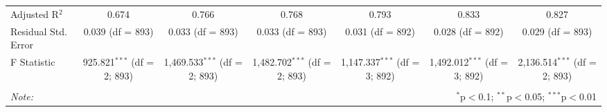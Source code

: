 \begin{table}[!htbp]
\begin{tabular}{@{\extracolsep{5pt}}lcccccc}
Adjusted R$^{2}$ & 0.674 & 0.766 & 0.768 & 0.793 & 0.833 & 0.827 \\
Residual Std. Error & 0.039 (df = 893) & 0.033 (df = 893) & 0.033 (df = 893) & 0.031 (df = 892) & 0.028 (df = 892) & 0.029 (df = 893) \\
F Statistic & 925.821$^{***}$ (df = 2; 893) & 1,469.533$^{***}$ (df = 2; 893) & 1,482.702$^{***}$ (df = 2; 893) & 1,147.337$^{***}$ (df = 3; 892) & 1,492.012$^{***}$ (df = 3; 892) & 2,136.514$^{***}$ (df = 2; 893) \\
\hline
\hline \\[-1.8ex]
\textit{Note:}  & \multicolumn{6}{r}{$^{*}$p$<$0.1; $^{**}$p$<$0.05; $^{***}$p$<$0.01} \\
\end{tabular}
\end{table}
